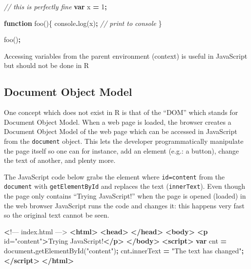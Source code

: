 \documentclass[
]{krantz}
\makeatletter
\newenvironment{Shaded}{\begin{snugshade}}{\end{snugshade}}
\newcommand{\AttributeTok}[1]{\textcolor[rgb]{0.61,0.61,0.61}{#1}}
\newcommand{\BuiltInTok}[1]{#1}
\newcommand{\CommentTok}[1]{\textcolor[rgb]{0.37,0.37,0.37}{\textit{#1}}}
\newcommand{\DecValTok}[1]{\textcolor[rgb]{0.06,0.06,0.06}{#1}}
\newcommand{\ErrorTok}[1]{\textcolor[rgb]{0.14,0.14,0.14}{\textbf{#1}}}
\newcommand{\FunctionTok}[1]{\textcolor[rgb]{0,0,0}{#1}}
\newcommand{\KeywordTok}[1]{\textcolor[rgb]{0.27,0.27,0.27}{\textbf{#1}}}
\newcommand{\NormalTok}[1]{#1}
\newcommand{\OperatorTok}[1]{\textcolor[rgb]{0.43,0.43,0.43}{\textbf{#1}}}
\newcommand{\OtherTok}[1]{\textcolor[rgb]{0.37,0.37,0.37}{#1}}
\newcommand{\StringTok}[1]{\textcolor[rgb]{0.5,0.5,0.5}{#1}}
\newenvironment{kframe}{%
\medskip{}
\setlength{\fboxsep}{.8em}
 \def\at@end@of@kframe{}%
 \ifinner\ifhmode%
  \def\at@end@of@kframe{\end{minipage}}%
  \begin{minipage}{\columnwidth}%
 \fi\fi%
 \def\FrameCommand##1{\hskip\@totalleftmargin \hskip-\fboxsep
 \colorbox{shadecolor}{##1}\hskip-\fboxsep
     \hskip-\linewidth \hskip-\@totalleftmargin \hskip\columnwidth}%
 \MakeFramed {\advance\hsize-\width
   \@totalleftmargin\z@ \linewidth\hsize
   \@setminipage}}%
 {\par\unskip\endMakeFramed%
 \at@end@of@kframe}
\renewenvironment{Shaded}{\begin{kframe}}{\end{kframe}}
\newenvironment{rmdblock}[1]
  {
  \begin{itemize}
  \renewcommand{\labelitemi}{
    \raisebox{-.7\height}[0pt][0pt]{
      {\setkeys{Gin}{width=3em,keepaspectratio}\texttt{[image: images/\#1]}}
    }
  }
  \setlength{\fboxsep}{1em}
  \begin{kframe}
  \item
  }
  {
  \end{kframe}
  \end{itemize}
  }
\newenvironment{rmdnote}
  {\begin{rmdblock}{note}}
  {\end{rmdblock}}
\makeatother
\begin{document}
\begin{Shaded}
\begin{Highlighting}[]
\CommentTok{// this is perfectly fine}
\KeywordTok{var}\NormalTok{ x }\OperatorTok{=} \DecValTok{1}\OperatorTok{;}

\KeywordTok{function} \FunctionTok{foo}\NormalTok{()\{}
  \BuiltInTok{console}\OperatorTok{.}\FunctionTok{log}\NormalTok{(x)}\OperatorTok{;} \CommentTok{// print to console}
\NormalTok{\}}

\NormalTok{foo()}\OperatorTok{;}
\end{Highlighting}
\end{Shaded}

\begin{rmdnote}
Accessing variables from the parent environment (context) is useful in
JavaScript but should not be done in R
\end{rmdnote}

\hypertarget{basics-object-model}{%
\subsection{Document Object Model}\label{basics-object-model}}

One concept which does not exist in R is that of the ``DOM'' which stands for Document Object Model. When a web page is loaded, the browser creates a Document Object Model of the web page which can be accessed in JavaScript from the \texttt{document} object. This lets the developer programmatically manipulate the page itself so one can for instance, add an element (e.g.: a button), change the text of another, and plenty more.

The JavaScript code below grabs the element where \texttt{id=\textquotesingle{}content\textquotesingle{}} from the \texttt{document} with \texttt{getElementById} and replaces the text (\texttt{innerText}). Even though the page only contains ``Trying JavaScript!'' when the page is opened (loaded) in the web browser JavaScript runs the code and changes it: this happens very fast so the original text cannot be seen.

\begin{Shaded}
\begin{Highlighting}[]
 \ErrorTok{\textless{}}\NormalTok{!–– index.html ––\textgreater{}}
\KeywordTok{\textless{}html\textgreater{}}
  \KeywordTok{\textless{}head\textgreater{}}
  \KeywordTok{\textless{}/head\textgreater{}}
  \KeywordTok{\textless{}body\textgreater{}}
    \KeywordTok{\textless{}p}\OtherTok{ id=}\StringTok{"content"}\KeywordTok{\textgreater{}}\NormalTok{Trying JavaScript!}\KeywordTok{\textless{}/p\textgreater{}}
  \KeywordTok{\textless{}/body\textgreater{}}
  \KeywordTok{\textless{}script\textgreater{}}
    \KeywordTok{var}\NormalTok{ cnt }\OperatorTok{=} \BuiltInTok{document}\OperatorTok{.}\FunctionTok{getElementById}\NormalTok{(}\StringTok{"content"}\NormalTok{)}\OperatorTok{;}
\NormalTok{    cnt}\OperatorTok{.}\AttributeTok{innerText} \OperatorTok{=} \StringTok{"The text has changed"}\OperatorTok{;}
  \KeywordTok{\textless{}/script\textgreater{}}
\KeywordTok{\textless{}/html\textgreater{}}
\end{Highlighting}
\end{Shaded}
\end{document}
